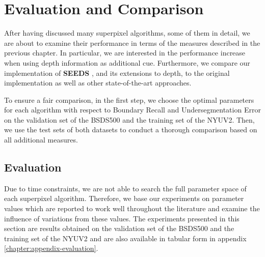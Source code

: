 \chapter{Evaluation and Comparison}
\label{chapter:evaluation}

After having discussed many superpixel algorithms, some of them in detail, we are about to examine their performance in terms of the measures described in the previous chapter. In particular, we are interested in the performance increase when using depth information as additional cue. Furthermore, we compare our implementation of \textbf{SEEDS} \cite{VanDenBerghBoixRoigCapitaniVanGool:2012}, and its extensions to depth, to the original implementation as well as other state-of-the-art approaches.

To ensure a fair comparison, in the first step, we choose the optimal parameters for each algorithm with respect to Boundary Recall and Undersegmentation Error on the validation set of the BSDS500 and the training set of the NYUV2. Then, we use the test sets of both datasets to conduct a thorough comparison based on all additional measures.


\section{Evaluation}
\label{section:evaluation-evaluation}

Due to time constraints, we are not able to search the full parameter space of each superpixel algorithm. Therefore, we base our experiments on parameter values which are reported to work well throughout the literature and examine the influence of variations from these values. The experiments presented in this section are results obtained on the validation set of the BSDS500 and the training set of the NYUV2 and are also available in tabular form in appendix \ref{chapter:appendix-evaluation}.


